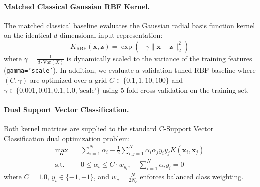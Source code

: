 \documentclass[10pt,twocolumn,letterpaper]{article}
\begin{document}
\paragraph{Matched Classical Gaussian RBF Kernel.} The matched classical baseline evaluates the Gaussian radial basis function kernel on the identical $d$-dimensional input representation:
\begin{equation}
K_{\text{RBF}}(\mathbf{x}, \mathbf{z}) = \exp\left( -\gamma \|\mathbf{x} - \mathbf{z}\|_2^2 \right)
\end{equation}
where $\gamma = \frac{1}{d \cdot \text{Var}(X)}$ is dynamically scaled to the variance of the training features (\texttt{gamma='scale'}). In addition, we evaluate a validation-tuned RBF baseline where $(C, \gamma)$ are optimized over a grid $C \in \{0.1, 1, 10, 100\}$ and $\gamma \in \{0.001, 0.01, 0.1, 1.0, \text{'scale'}\}$ using 5-fold cross-validation on the training set.

\paragraph{Dual Support Vector Classification.} Both kernel matrices are supplied to the standard C-Support Vector Classification dual optimization problem:
\begin{align}
\max_{\boldsymbol{\alpha}} \quad & \sum_{i=1}^N \alpha_i - \frac{1}{2} \sum_{i,j=1}^N \alpha_i \alpha_j y_i y_j K(\mathbf{x}_i, \mathbf{x}_j) \\
\text{s.t.} \quad & 0 \le \alpha_i \le C \cdot w_{y_i}, \quad \sum_{i=1}^N \alpha_i y_i = 0
\end{align}
where $C = 1.0$, $y_i \in \{-1, +1\}$, and $w_c = \frac{N}{2 N_c}$ enforces balanced class weighting.
\end{document}
